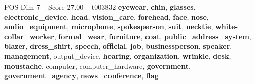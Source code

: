 \begin{textsample}{POS Dim 7 – Score 27.00 – t003832}  \label{ex:f7_pos_038}
\textbf{eyewear}, \textbf{chin}, \textbf{glasses}, \textbf{electronic\_device}, \textbf{head}, \textbf{vision\_care}, \textbf{forehead}, \textbf{face}, \textbf{nose}, \textbf{audio\_equipment}, \textbf{microphone}, \textbf{spokesperson}, \textbf{suit}, \textbf{necktie}, \textbf{white-collar\_worker}, \textbf{formal\_wear}, \textbf{furniture}, \textbf{coat}, \textbf{public\_address\_system}, \textbf{blazer}, \textbf{dress\_shirt}, \textbf{speech}, \textbf{official}, \textbf{job}, \textbf{businessperson}, \textbf{speaker}, \textbf{management}, output\_device, \textbf{hearing}, \textbf{organization}, \textbf{wrinkle}, \textbf{desk}, \textbf{moustache}, computer, computer\_hardware, \textbf{government}, \textbf{government\_agency}, \textbf{news\_conference}, \textbf{flag}

\end{textsample}

